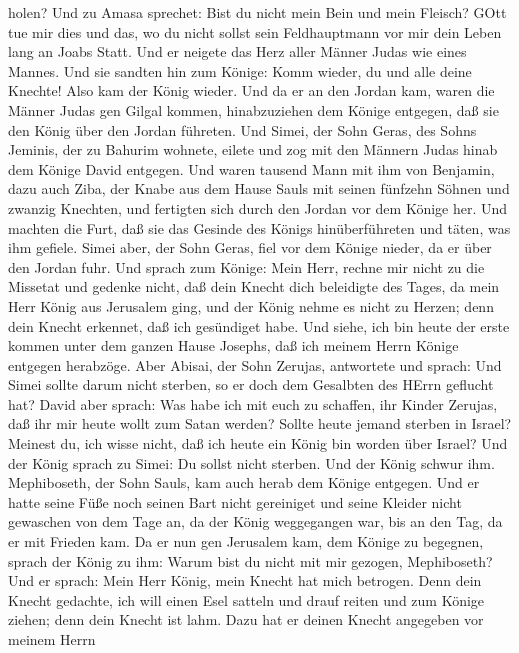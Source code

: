 holen?  Und zu Amasa sprechet: Bist du nicht mein Bein und
mein Fleisch? GOtt tue mir dies und das, wo du nicht sollst sein
Feldhauptmann vor mir dein Leben lang an Joabs Statt.  Und
er neigete das Herz aller Männer Judas wie eines Mannes. Und sie sandten
hin zum Könige: Komm wieder, du und alle deine Knechte! 
Also kam der König wieder. Und da er an den Jordan kam, waren die Männer
Judas gen Gilgal kommen, hinabzuziehen dem Könige entgegen, daß sie den
König über den Jordan führeten.  Und Simei, der Sohn Geras,
des Sohns Jeminis, der zu Bahurim wohnete, eilete und zog mit den
Männern Judas hinab dem Könige David entgegen.  Und waren
tausend Mann mit ihm von Benjamin, dazu auch Ziba, der Knabe aus dem
Hause Sauls mit seinen fünfzehn Söhnen und zwanzig Knechten, und
fertigten sich durch den Jordan vor dem Könige her.  Und
machten die Furt, daß sie das Gesinde des Königs hinüberführeten und
täten, was ihm gefiele. Simei aber, der Sohn Geras, fiel vor dem Könige
nieder, da er über den Jordan fuhr.  Und sprach zum Könige:
Mein Herr, rechne mir nicht zu die Missetat und gedenke nicht, daß dein
Knecht dich beleidigte des Tages, da mein Herr König aus Jerusalem ging,
und der König nehme es nicht zu Herzen;  denn dein Knecht
erkennet, daß ich gesündiget habe. Und siehe, ich bin heute der erste
kommen unter dem ganzen Hause Josephs, daß ich meinem Herrn Könige
entgegen herabzöge.  Aber Abisai, der Sohn Zerujas,
antwortete und sprach: Und Simei sollte darum nicht sterben, so er doch
dem Gesalbten des HErrn geflucht hat?  David aber sprach:
Was habe ich mit euch zu schaffen, ihr Kinder Zerujas, daß ihr mir heute
wollt zum Satan werden? Sollte heute jemand sterben in Israel? Meinest
du, ich wisse nicht, daß ich heute ein König bin worden über Israel?
 Und der König sprach zu Simei: Du sollst nicht sterben.
Und der König schwur ihm.  Mephiboseth, der Sohn Sauls, kam
auch herab dem Könige entgegen. Und er hatte seine Füße noch seinen Bart
nicht gereiniget und seine Kleider nicht gewaschen von dem Tage an, da
der König weggegangen war, bis an den Tag, da er mit Frieden kam.
 Da er nun gen Jerusalem kam, dem Könige zu begegnen,
sprach der König zu ihm: Warum bist du nicht mit mir gezogen,
Mephiboseth?  Und er sprach: Mein Herr König, mein Knecht
hat mich betrogen. Denn dein Knecht gedachte, ich will einen Esel
satteln und drauf reiten und zum Könige ziehen; denn dein Knecht ist
lahm.  Dazu hat er deinen Knecht angegeben vor meinem Herrn
